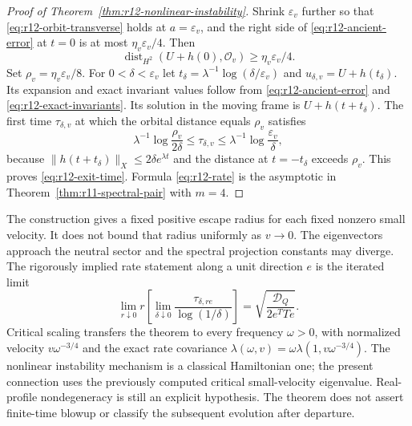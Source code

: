 \begin{proof}[Proof of Theorem~\ref{thm:r12-nonlinear-instability}]
Shrink $\varepsilon_v$ further so that
\eqref{eq:r12-orbit-transverse} holds at $a=\varepsilon_v$, and the
right side of \eqref{eq:r12-ancient-error} at $t=0$ is at most
$\eta_v\varepsilon_v/4$. Then
\[
 \operatorname{dist}_{H^2}(U+h(0),\mathcal O_v)
                         \ge\eta_v\varepsilon_v/4.
\]
Set $\rho_v=\eta_v\varepsilon_v/8$. For $0<\delta<\varepsilon_v$
let $t_\delta=\lambda^{-1}\log(\delta/\varepsilon_v)$ and
$u_{\delta,v}=U+h(t_\delta)$. Its expansion and exact invariant values
follow from \eqref{eq:r12-ancient-error} and
\eqref{eq:r12-exact-invariants}. Its solution in the moving frame is
$U+h(t+t_\delta)$. The first time $\tau_{\delta,v}$ at which the
orbital distance equals $\rho_v$ satisfies
\[
 \lambda^{-1}\log\frac{\rho_v}{2\delta}
 \le\tau_{\delta,v}\le
 \lambda^{-1}\log\frac{\varepsilon_v}{\delta},
\]
because $\|h(t+t_\delta)\|_X\le2\delta e^{\lambda t}$ and the
distance at $t=-t_\delta$ exceeds $\rho_v$.
This proves \eqref{eq:r12-exit-time}. Formula \eqref{eq:r12-rate}
is the asymptotic in Theorem~\ref{thm:r11-spectral-pair} with $m=4$.
\end{proof}

\begin{remark}
The construction gives a fixed positive escape radius for each fixed
nonzero small velocity. It does not bound that radius uniformly as
$v\to0$. The eigenvectors approach the neutral sector and the spectral
projection constants may diverge. The rigorously implied rate statement
along a unit direction $e$ is the iterated limit
\[
 \lim_{r\downarrow0}r\left[
   \lim_{\delta\downarrow0}
      \frac{\tau_{\delta,re}}{\log(1/\delta)}\right]
       =\sqrt{\frac{\mathcal D_Q}{2e^TTe}}.
\]
Critical scaling transfers the theorem to every frequency $\omega>0$,
with normalized velocity $v\omega^{-3/4}$ and the exact rate covariance
$\lambda(\omega,v)=\omega\lambda(1,v\omega^{-3/4})$.
The nonlinear instability mechanism is a classical Hamiltonian one;
the present connection uses the previously computed critical
small-velocity eigenvalue. Real-profile nondegeneracy is still an
explicit hypothesis. The theorem does not assert finite-time blowup or
classify the subsequent evolution after departure.
\end{remark}
